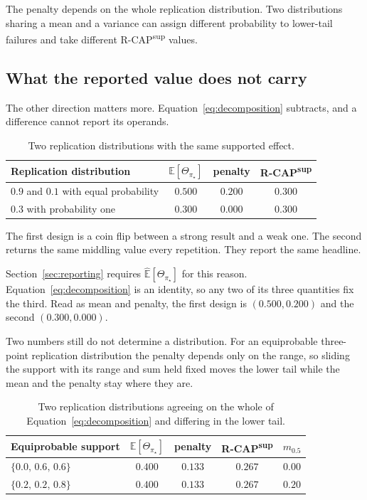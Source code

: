 \documentclass[11pt]{article}
\newcommand{\E}{\mathbb{E}}
\theoremstyle{remark}
\begin{document}
The penalty depends on the whole replication distribution. Two distributions sharing a mean and a variance can assign different probability to lower-tail failures and take different R-CAP\textsuperscript{sup} values.

\subsection{What the reported value does not carry}
\label{sec:collision}

The other direction matters more. Equation~\eqref{eq:decomposition} subtracts, and a difference cannot report its operands.

\begin{table}[ht]
\centering
\caption{Two replication distributions with the same supported effect.}
\label{tab:collision}
\begin{tabular}{@{}lccc@{}}
\toprule
Replication distribution & $\E[\Theta_{\pi_\star}]$ & penalty & R-CAP\textsuperscript{sup} \\
\midrule
$0.9$ and $0.1$ with equal probability & $0.500$ & $0.200$ & $0.300$ \\
$0.3$ with probability one & $0.300$ & $0.000$ & $0.300$ \\
\bottomrule
\end{tabular}
\end{table}

The first design is a coin flip between a strong result and a weak one. The second returns the same middling value every repetition. They report the same headline.

Section~\ref{sec:reporting} requires $\widehat{\E}[\Theta_{\pi_\star}]$ for this reason. Equation~\eqref{eq:decomposition} is an identity, so any two of its three quantities fix the third. Read as mean and penalty, the first design is $(0.500,0.200)$ and the second $(0.300,0.000)$.

Two numbers still do not determine a distribution. For an equiprobable three-point replication distribution the penalty depends only on the range, so sliding the support with its range and sum held fixed moves the lower tail while the mean and the penalty stay where they are.

\begin{table}[ht]
\centering
\caption{Two replication distributions agreeing on the whole of Equation~\eqref{eq:decomposition} and differing in the lower tail.}
\label{tab:collision-tail}
\begin{tabular}{@{}lcccc@{}}
\toprule
Equiprobable support & $\E[\Theta_{\pi_\star}]$ & penalty & R-CAP\textsuperscript{sup} & $m_{0.5}$ \\
\midrule
$\{0.0,\,0.6,\,0.6\}$ & $0.400$ & $0.133$ & $0.267$ & $0.00$ \\
$\{0.2,\,0.2,\,0.8\}$ & $0.400$ & $0.133$ & $0.267$ & $0.20$ \\
\bottomrule
\end{tabular}
\end{table}
\end{document}
